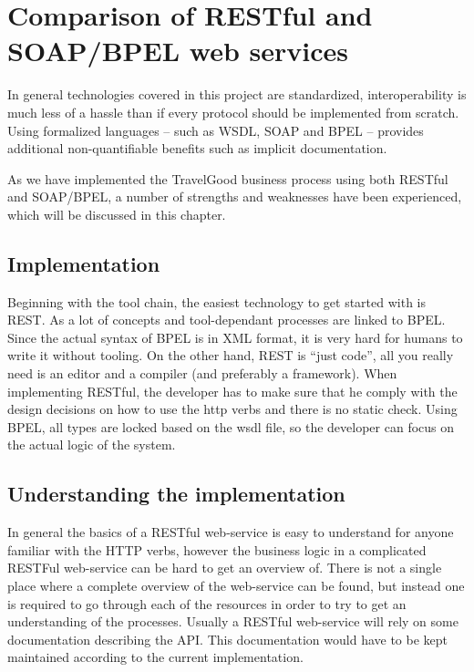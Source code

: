 {\setlength{\chapterfontsize}{26pt}
\chapter{Comparison of RESTful and SOAP/BPEL web services}
}
\kim

\noindent
In general technologies covered in this project are standardized, interoperability is much less of a hassle than if every protocol should be implemented from scratch. Using formalized languages -- such as WSDL, SOAP and BPEL -- provides additional non-quantifiable benefits such as implicit documentation.

As we have implemented the TravelGood business process using both RESTful and SOAP/BPEL, a number of strengths and weaknesses have been experienced, which will be discussed in this chapter.

\section{Implementation}
\mrb

\noindent
Beginning with the tool chain, the easiest technology to get started with is REST. As a lot of concepts and tool-dependant processes are linked to BPEL. Since the actual syntax of BPEL is in XML format, it is very hard for humans to write it without tooling. On the other hand, REST is ``just code'', all you really need is an editor and a compiler (and preferably a framework). When implementing RESTful, the developer has to make sure that he comply with the design decisions on how to use the http verbs and there is no static check. Using BPEL, all types are locked based on the wsdl file, so the developer can focus on the actual logic of the system. 

\section{Understanding the implementation}
\mkt

\noindent
In general the basics of a RESTful web-service is easy to understand for anyone familiar with the HTTP verbs, however the business logic in a complicated RESTFul web-service can be hard to get an overview of. There is not a single place where a complete overview of the web-service can be found, but instead one is required to go through each of the resources in order to try to get an understanding of the processes. Usually a RESTful web-service will rely on some documentation describing the API. This documentation would have to be kept maintained according to the current implementation. 

